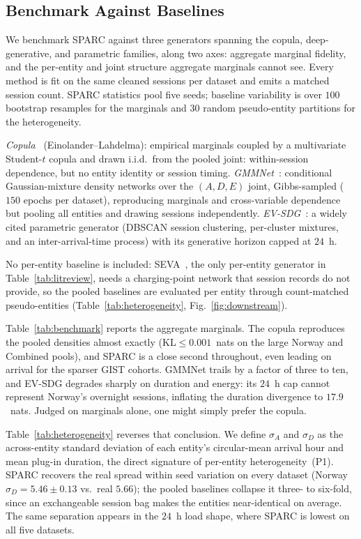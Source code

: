 \documentclass[journal]{IEEEtran}
\begin{document}
\subsection{Benchmark Against Baselines}
\label{subsec:benchmark}
We benchmark SPARC against three generators spanning the copula, deep-generative, and parametric families, along two axes: aggregate marginal fidelity, and the per-entity and joint structure aggregate marginals cannot see. Every method is fit on the same cleaned sessions per dataset and emits a matched session count. SPARC statistics pool five seeds; baseline variability is over $100$ bootstrap resamples for the marginals and $30$ random pseudo-entity partitions for the heterogeneity.

\emph{Copula~\cite{einolander2021}} (Einolander--Lahdelma): empirical marginals coupled by a multivariate Student-$t$ copula and drawn i.i.d.\ from the pooled joint: within-session dependence, but no entity identity or session timing. \emph{GMMNet~\cite{li2024synthesis}}: conditional Gaussian-mixture density networks over the $(A,D,E)$ joint, Gibbs-sampled ($150$ epochs per dataset), reproducing marginals and cross-variable dependence but pooling all entities and drawing sessions independently. \emph{EV-SDG~\cite{lahariya2020}}: a widely cited parametric generator (DBSCAN session clustering, per-cluster mixtures, and an inter-arrival-time process) with its generative horizon capped at $24$~h.

No per-entity baseline is included: SEVA~\cite{helmus2022validated}, the only per-entity generator in Table~\ref{tab:litreview}, needs a charging-point network that session records do not provide, so the pooled baselines are evaluated per entity through count-matched pseudo-entities (Table~\ref{tab:heterogeneity}, Fig.~\ref{fig:downstream}).

Table~\ref{tab:benchmark} reports the aggregate marginals. The copula reproduces the pooled densities almost exactly ($\mathrm{KL}\le0.001$~nats on the large Norway and Combined pools), and SPARC is a close second throughout, even leading on arrival for the sparser GIST cohorts. GMMNet trails by a factor of three to ten, and EV-SDG degrades sharply on duration and energy: its $24$~h cap cannot represent Norway's overnight sessions, inflating the duration divergence to $17.9$~nats. Judged on marginals alone, one might simply prefer the copula.

Table~\ref{tab:heterogeneity} reverses that conclusion. We define $\sigma_A$ and $\sigma_D$ as the across-entity standard deviation of each entity's circular-mean arrival hour and mean plug-in duration, the direct signature of per-entity heterogeneity~(P1). SPARC recovers the real spread within seed variation on every dataset (Norway $\sigma_D=5.46\pm0.13$ vs.\ real $5.66$); the pooled baselines collapse it three- to six-fold, since an exchangeable session bag makes the entities near-identical on average. The same separation appears in the $24$~h load shape, where SPARC is lowest on all five datasets.
\end{document}
